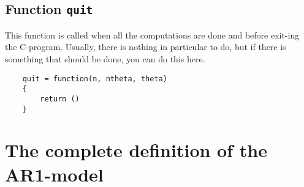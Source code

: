 \documentclass[a4paper,11pt]{article}
\begin{document}
\subsection*{Function \texttt{quit}}

This function is called when all the computations are done and before
exit-ing the C-program. Usually, there is nothing in particular to do,
but if there is something that should be done, you can do this here.
\begin{verbatim}
    quit = function(n, ntheta, theta)
    {
        return ()
    }
\end{verbatim}

\section*{The complete definition of the AR1-model}
\end{document}
